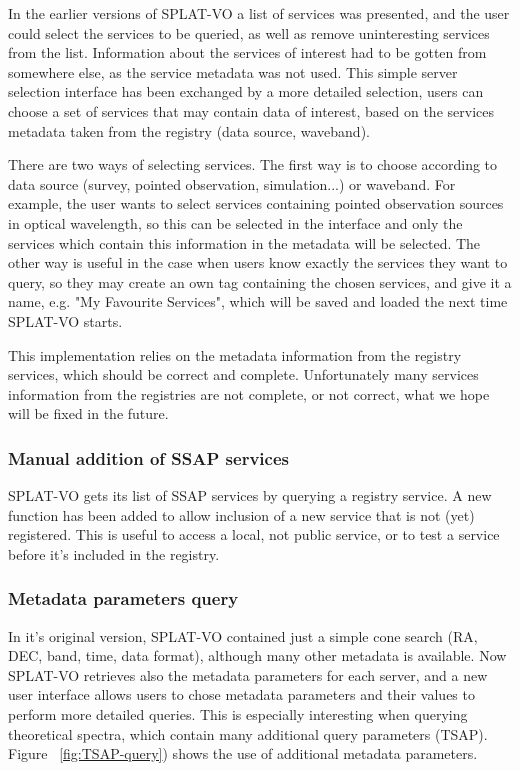 \documentclass[final,authoryear,5p,times,twocolumn]{elsarticle}
\begin{document}
In the earlier versions of SPLAT-VO a list of services was presented, and
the user could select the services to be queried, as well as remove
uninteresting services from the list. Information about the services
of interest had to be gotten from somewhere else, as the service
metadata was not used.  This simple server selection interface has
been exchanged by a more detailed selection, users can choose a set of
services that may contain data of interest, based on the services
metadata taken from the registry (data source, waveband).

There are two ways of selecting services. The first way is to choose
according to data source (survey, pointed observation, simulation...)
or waveband.  For example, the user wants to select services
containing pointed observation sources in optical wavelength, so this
can be selected in the interface and only the services which contain
this information in the metadata will be selected.  The other way is
useful in the case when users know exactly the services they want to
query, so they may create an own tag containing the chosen services,
and give it a name, e.g. "My Favourite Services", which will be saved
and loaded the next time SPLAT-VO starts.

This implementation relies on the metadata information from the
registry services, which should be correct and complete. Unfortunately
many services information from the registries are not complete, or not
correct, what we hope will be fixed in the future.



\subsubsection{Manual addition of SSAP services}

SPLAT-VO gets its list of SSAP services by querying a registry
service.  A new function has been added to allow inclusion of a new
service that is not (yet) registered. This is useful to access a
local, not public service, or to test a service before it's included
in the registry.

\subsubsection{Metadata parameters query}

In it's original version, SPLAT-VO contained just a simple cone search
(RA, DEC, band, time, data format), although many other metadata is
available.  Now SPLAT-VO retrieves also the metadata parameters for each
server, and a new user interface allows users to chose metadata
parameters and their values to perform more detailed queries.  This is
especially interesting when querying theoretical spectra, which
contain many additional query parameters (TSAP). Figure ~\ref{fig:TSAP-query})
shows the use of additional metadata parameters.
\end{document}
